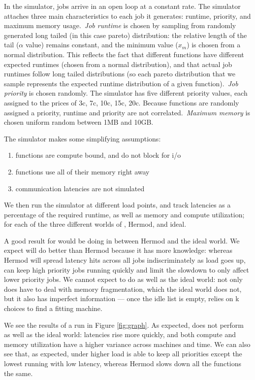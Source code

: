 In the simulator, jobs arrive in an open loop at a constant rate. The simulator
attaches three main characteristics to each job it generates: runtime, priority,
and maximum memory usage.\ \textit{Job runtime} is chosen by sampling from
randomly generated long tailed (in this case pareto) distribution: the relative
length of the tail ($\alpha$ value) remains constant, and the minimum value
($x_m$) is chosen from a normal distribution. This reflects the fact that
different functions have different expected runtimes (chosen from a normal
distribution), and that actual job runtimes follow long tailed distributions (so
each pareto distribution that we sample represents the expected runtime
distribution of a given function).\ \textit{Job priority} is chosen randomly. The
simulator has five different priority values, each assigned to the prices of 3c,
7c, 10c, 15c, 20c.
Because functions are randomly assigned a priority, runtime and priority are not
correlated.\ \textit{Maximum memory} is chosen uniform random between 1MB and
10GB.

The simulator makes some simplifying assumptions:
\begin{enumerate}
    \item functions are compute bound, and do not block for i/o
    \item functions use all of their memory right away
    \item communication latencies are not simulated
\end{enumerate}


We then run the simulator at different load points, and track latencies as a
percentage of the required runtime, as well as memory and compute utilization;
for each of the three different worlds of \sys{}, Hermod, and ideal.

A good result for \sys{} would be doing in between Hermod and the ideal world.
We expect \sys{} will do better than Hermod because it has more knowledge:
whereas Hermod will spread latency hits across all jobs indiscriminately as load
goes up, \sys{} can keep high priority jobs running quickly and limit the
slowdown to only affect lower priority jobs. We cannot expect \sys{} to do as
well as the ideal world: not only does \sys{} have to deal with memory
fragmentation, which the ideal world does not, but it also has imperfect
information --- once the idle list is empty, \sys{} relies on k choices to find
a fitting machine. 

We see the results of a run in Figure \ref{fig:graph}. As expected, \sys{} does
not perform as well as the ideal world: latencies rise more quickly, and both
compute and memory utilization have a higher variance across machines and time.
We can also see that, as expected, under higher load \sys{} is able to keep all
priorities except the lowest running with low latency, whereas Hermod slows down
all the functions the same.


